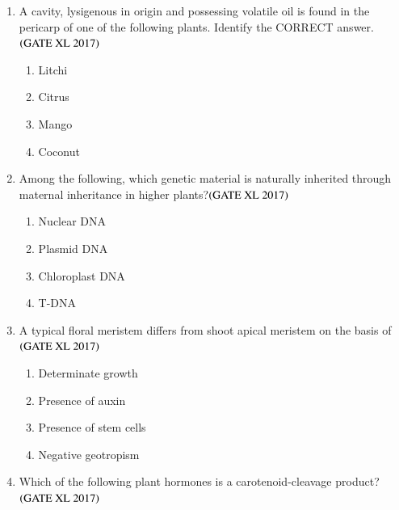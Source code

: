 \documentclass[journal]{IEEEtran}
\begin{document}
\begin{enumerate}
\item A cavity, lysigenous in origin and possessing volatile oil is found in the pericarp of one of the following plants. Identify the CORRECT answer.\hfill $\left(\text{GATE XL 2017}\right)$
\begin{multicols}{4}
\begin{enumerate}
\item Litchi
\item Citrus
\item Mango
\item Coconut
\end{enumerate}
\end{multicols}

\item Among the following, which genetic material is naturally inherited through maternal inheritance in higher plants?\hfill $\left(\text{GATE XL 2017}\right)$
\begin{multicols}{2}
\begin{enumerate}
\item Nuclear DNA
\item Plasmid DNA
\item Chloroplast DNA
\item T-DNA
\end{enumerate}
\end{multicols}

\item A typical floral meristem differs from shoot apical meristem on the basis of\hfill $\left(\text{GATE XL 2017}\right)$
\begin{multicols}{2}
\begin{enumerate}
\item Determinate growth
\item Presence of auxin
\item Presence of stem cells
\item Negative geotropism
\end{enumerate}
\end{multicols}

\item Which of the following plant hormones is a carotenoid-cleavage product? \hfill $\left(\text{GATE XL 2017}\right)$
\begin{enumerate}
\end{enumerate}


\end{enumerate}
\end{document}
